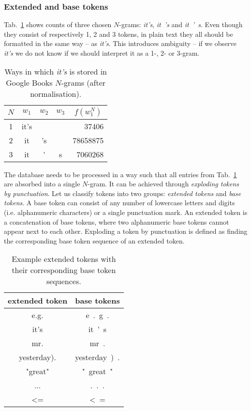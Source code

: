 \documentclass{IIBproject}
\makeatletter
\newcommand*{\ie}{i.e.\@\xspace}
\makeatother
\begin{document}
\subsubsection{Extended and base tokens}

Tab.~\ref{tab:its_ngrams} shows counts of three chosen $N$-grams: \emph{it's}, \emph{it\ 's} and \emph{it\ '\ s}. Even though they consist of respectively 1, 2 and 3 tokens, in plain text they all should be formatted in the same way -- as \emph{it's}. This introduces ambiguity -- if we observe \emph{it's} we do not know if we should interpret it as a 1-, 2- or 3-gram.

\begin{table}[h]
	\centering
	\begin{tabular}{c | c | c | c | r}
	$N$ & $w_1$ & $w_2$ & $w_3$ & \multicolumn{1}{c}{$f(w_1^N)$} \\
	\hline
	1 & it's & & & \num{37406} \\
	2 & it & 's & & \num{78658875} \\
	3 & it & ' & s & \num{7060268}
	\end{tabular}
	\caption{\label{tab:its_ngrams}Ways in which \emph{it's} is stored in Google Books $N$-grams (after normalisation).}
\end{table}

The database needs to be processed in a way such that all entries from Tab.~\ref{tab:its_ngrams} are absorbed into a single $N$-gram. It can be achieved through \emph{exploding tokens by punctuation}. Let us classify tokens into two groups: \emph{extended tokens} and \emph{base tokens}. A base token can consist of any number of lowercase letters and digits (\ie alphanumeric characters) or a single punctuation mark. An extended token is a concatenation of base tokens, where two alphanumeric base tokens cannot appear next to each other. Exploding a token by punctuation is defined as finding the corresponding base token sequence of an extended token.

\begin{table}[h]
	\centering
	\begin{tabular}{c | c}
	extended token & base tokens \\
	\hline
	e.g. & e\ .\ g\ . \\
	it's & it\ '\ s \\
	mr. & mr\ . \\
	yesterday). & yesterday\ )\ . \\
	"great" & "\ great\ " \\
	... & .\ .\ . \\
	\textless= & \textless\ =
	\end{tabular}
	\caption{\label{tab:extended_tokens}Example extended tokens with their corresponding base token sequences.}
\end{table}
\end{document}
